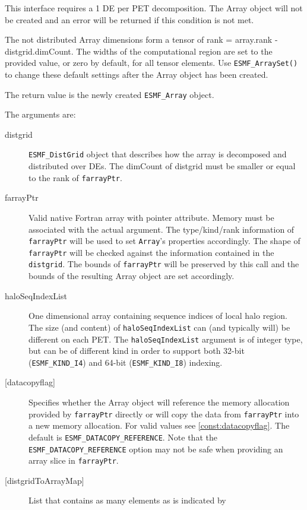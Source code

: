    This interface requires a 1 DE per PET decomposition. The Array object will 
   not be created and an error will be returned if this condition is not met. 
   
   The not distributed Array dimensions form a tensor of rank = array.rank - 
   distgrid.dimCount. The widths of the computational region are set to 
   the provided value, or zero by default, for all tensor elements. Use 
   {\tt ESMF\_ArraySet()} to change these default settings after the 
   Array object has been created. 
   
   The return value is the newly created {\tt ESMF\_Array} object. 
   
   The arguments are: 
   \begin{description} 
   \item[distgrid] 
   {\tt ESMF\_DistGrid} object that describes how the array is decomposed and 
   distributed over DEs. The dimCount of distgrid must be smaller or equal 
   to the rank of {\tt farrayPtr}. 
   \item[farrayPtr] 
   Valid native Fortran array with pointer attribute. Memory must be 
   associated with the actual argument. The type/kind/rank information of 
   {\tt farrayPtr} will be used to set {\tt Array}'s properties 
   accordingly. The shape of {\tt farrayPtr} will be checked against the 
   information contained in the {\tt distgrid}. The bounds of 
   {\tt farrayPtr} will be preserved by this call and the bounds of the 
   resulting Array object are set accordingly. 
   \item[haloSeqIndexList] 
   One dimensional array containing sequence indices of local halo region. 
   The size (and content) of {\tt haloSeqIndexList} can (and typically will) 
   be different on each PET. 
   The {\tt haloSeqIndexList} argument is of integer type, but can be of 
   different kind in order to support both 32-bit ({\tt ESMF\_KIND\_I4}) 
   and 64-bit ({\tt ESMF\_KIND\_I8}) indexing. 
   \item[{[datacopyflag]}] 
   Specifies whether the Array object will reference the memory allocation 
   provided by {\tt farrayPtr} directly or will copy the data from 
   {\tt farrayPtr} into a new memory allocation. For valid values see 
   \ref{const:datacopyflag}. The default is {\tt ESMF\_DATACOPY\_REFERENCE}. 
   Note that the {\tt ESMF\_DATACOPY\_REFERENCE} option may not be safe 
   when providing an array slice in {\tt farrayPtr}. 
   \item[{[distgridToArrayMap]}] 
   List that contains as many elements as is indicated by 

\end{description}
